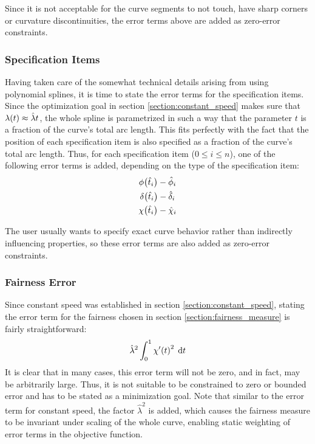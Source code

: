 \documentclass[a4paper]{article}
\begin{document}
				Since it is not acceptable for the curve segments to not touch, have sharp corners or curvature discontinuities, the error terms above are added as zero-error constraints.

			\subsubsection{Specification Items}
			\label{section:specification_items}

				Having taken care of the somewhat technical details arising from using polynomial splines, it is time to state the error terms for the specification items. Since the optimization goal in section \ref{section:constant_speed} makes sure that \(\lambda\!\left( t \right) \approx \hat{\lambda}t\), the whole spline is parametrized in such a way that the parameter \(t\) is a fraction of the curve's total arc length. This fits perfectly with the fact that the position of each specification item is also specified as a fraction of the curve's total arc length. Thus, for each specification item (\(0 \leq i \leq n\)), one of the following error terms is added, depending on the type of the specification item:
				\begin{equation*}
					\begin{gathered}
						\phi\!\left( \hat{t}_i \right) - \hat{\phi}_i\\
						\delta\!\left( \hat{t}_i \right) - \hat{\delta}_i\\
						\chi\!\left( \hat{t}_i \right) - \hat{\chi}_i
					\end{gathered}
				\end{equation*}

				The user usually wants to specify exact curve behavior rather than indirectly influencing properties, so these error terms are also added as zero-error constraints.

			\subsubsection{Fairness Error}
			\label{section:fairness_error}

				Since constant speed was established in section \ref{section:constant_speed}, stating the error term for the fairness chosen in section \ref{section:fairness_measure} is fairly straightforward:
				\begin{equation*}
					\hat{\lambda}^2\int_{0}^{1} \chi'\!\left( t \right)^2 \; \mathrm{d}t
				\end{equation*}
				It is clear that in many cases, this error term will not be zero, and in fact, may be arbitrarily large. Thus, it is not suitable to be constrained to zero or bounded error and has to be stated as a minimization goal. Note that similar to the error term for constant speed, the factor \(\hat{\lambda}^2\) is added, which causes the fairness measure to be invariant under scaling of the whole curve, enabling static weighting of error terms in the objective function.
\end{document}
